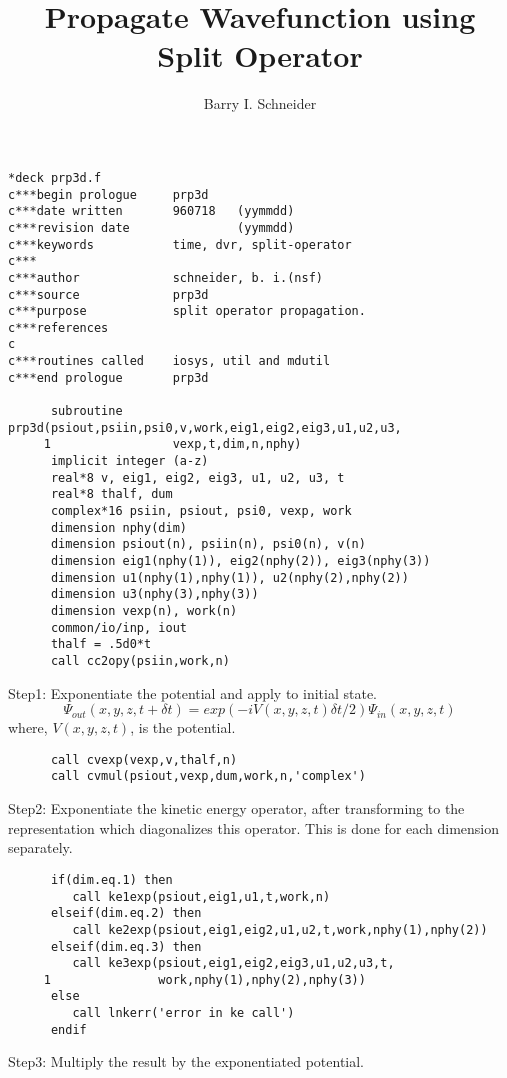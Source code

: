 \documentclass{article}
\title{Propagate Wavefunction using Split Operator}
\author{Barry I. Schneider}
\date{}
\begin{document}
 \maketitle
\begin{verbatim}
*deck prp3d.f 
c***begin prologue     prp3d
c***date written       960718   (yymmdd)
c***revision date               (yymmdd)
c***keywords           time, dvr, split-operator
c***                   
c***author             schneider, b. i.(nsf)
c***source             prp3d
c***purpose            split operator propagation.
c***references       
c
c***routines called    iosys, util and mdutil
c***end prologue       prp3d

      subroutine prp3d(psiout,psiin,psi0,v,work,eig1,eig2,eig3,u1,u2,u3,
     1                 vexp,t,dim,n,nphy)
      implicit integer (a-z)
      real*8 v, eig1, eig2, eig3, u1, u2, u3, t
      real*8 thalf, dum
      complex*16 psiin, psiout, psi0, vexp, work
      dimension nphy(dim)
      dimension psiout(n), psiin(n), psi0(n), v(n)
      dimension eig1(nphy(1)), eig2(nphy(2)), eig3(nphy(3))
      dimension u1(nphy(1),nphy(1)), u2(nphy(2),nphy(2))
      dimension u3(nphy(3),nphy(3))
      dimension vexp(n), work(n)
      common/io/inp, iout     
      thalf = .5d0*t
      call cc2opy(psiin,work,n)
\end{verbatim}
 Step1: Exponentiate the potential and apply to initial state.
\begin{equation}
    {\Psi}_{out}(x,y,z,t + {\delta}t) = exp( - i V(x,y,z,t) {\delta}t/2 )
                                {\Psi}_{in}(x,y,z,t) \nonumber
\end{equation}
 where, $V(x,y,z,t)$, is the potential.
\begin{verbatim}
      call cvexp(vexp,v,thalf,n)
      call cvmul(psiout,vexp,dum,work,n,'complex')   
\end{verbatim}
 Step2: Exponentiate the kinetic energy operator, after transforming to
 the representation which diagonalizes this operator.  This is done for each
 dimension separately.

\begin{verbatim}
      if(dim.eq.1) then
         call ke1exp(psiout,eig1,u1,t,work,n)
      elseif(dim.eq.2) then
         call ke2exp(psiout,eig1,eig2,u1,u2,t,work,nphy(1),nphy(2))
      elseif(dim.eq.3) then
         call ke3exp(psiout,eig1,eig2,eig3,u1,u2,u3,t,
     1               work,nphy(1),nphy(2),nphy(3))
      else
         call lnkerr('error in ke call')
      endif 
\end{verbatim}
 Step3: Multiply the result by the exponentiated potential.
        
\end{document}
